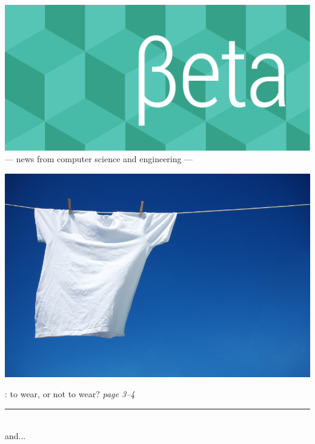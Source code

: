 \documentclass[twoside]{article}
\date{26 April 2016}
\begin{document}
\thispagestyle{empty}
\begingroup%
\vspace*{-3.5cm}\centering\hspace*{-2.8cm}%
\includegraphics[trim=0mm 20mm 0mm 0mm, clip, width=22cm]{../../style/beta-logo.pdf}%
\vspace{1em}
{\sffamily\fontsize{32pt}{32pt}\selectfont --- news from computer science and engineering ---}
\endgroup\vspace*{3ex}

\center
\includegraphics[trim=0mm 2mm 0mm 2mm, clip,width=\linewidth]{images/tshirts.jpg}

{\sffamily\fontsize{24pt}{24pt}\selectfont {\bfseries ``The Trouble With T-shirts``}: to wear, or not to wear?}%
\hfill{\rmfamily\fontsize{14pt}{14pt}\selectfont\it page 3--4}
\endcenter

\vfill\center\rule[4pt]{0.75\linewidth}{0.75pt}\\ {\sffamily\fontsize{24pt}{24pt}\selectfont and...}\endcenter\vfill
\end{document}
